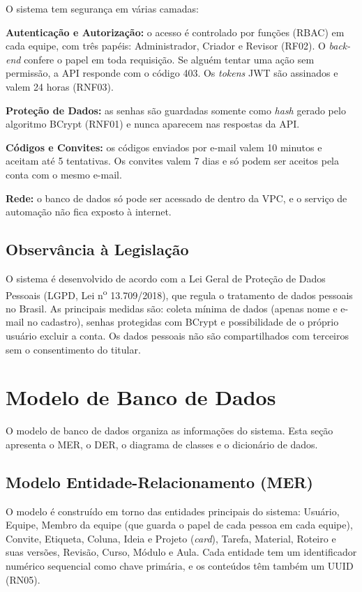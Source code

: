 O sistema tem segurança em várias camadas:

\textbf{Autenticação e Autorização:} o acesso é controlado por funções (RBAC) em cada equipe, com três papéis: Administrador, Criador e Revisor (RF02). O \textit{back-end} confere o papel em toda requisição. Se alguém tentar uma ação sem permissão, a API responde com o código 403. Os \textit{tokens} JWT são assinados e valem 24 horas (RNF03).

\textbf{Proteção de Dados:} as senhas são guardadas somente como \textit{hash} gerado pelo algoritmo BCrypt (RNF01) e nunca aparecem nas respostas da API.

\textbf{Códigos e Convites:} os códigos enviados por e-mail valem 10 minutos e aceitam até 5 tentativas. Os convites valem 7 dias e só podem ser aceitos pela conta com o mesmo e-mail.

\textbf{Rede:} o banco de dados só pode ser acessado de dentro da VPC, e o serviço de automação não fica exposto à internet.

\subsection{Observância à Legislação}

O sistema é desenvolvido de acordo com a Lei Geral de Proteção de Dados Pessoais (LGPD, Lei n\textsuperscript{o} 13.709/2018), que regula o tratamento de dados pessoais no Brasil. As principais medidas são: coleta mínima de dados (apenas nome e e-mail no cadastro), senhas protegidas com BCrypt e possibilidade de o próprio usuário excluir a conta. Os dados pessoais não são compartilhados com terceiros sem o consentimento do titular.

\section{Modelo de Banco de Dados}

O modelo de banco de dados organiza as informações do sistema. Esta seção apresenta o MER, o DER, o diagrama de classes e o dicionário de dados.

\subsection{Modelo Entidade-Relacionamento (MER)}

O modelo é construído em torno das entidades principais do sistema: Usuário, Equipe, Membro da equipe (que guarda o papel de cada pessoa em cada equipe), Convite, Etiqueta, Coluna, Ideia e Projeto (\textit{card}), Tarefa, Material, Roteiro e suas versões, Revisão, Curso, Módulo e Aula. Cada entidade tem um identificador numérico sequencial como chave primária, e os conteúdos têm também um UUID (RN05).

